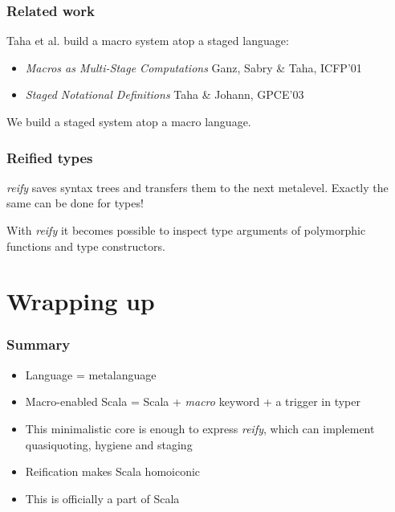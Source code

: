 \documentclass[hyperref={bookmarks=false}]{beamer}
\begin{document}
\begin{frame}[fragile]
\frametitle{Related work}

Taha et al. build a macro system atop a staged language:
\begin{itemize}
\item \emph{Macros as Multi-Stage Computations} Ganz, Sabry \& Taha, ICFP'01
\item \emph{Staged Notational Definitions} Taha \& Johann, GPCE'03
\end{itemize}

We build a staged system atop a macro language.

\end{frame}

\begin{frame}[fragile]
\frametitle{Reified types}

\emph{reify} saves syntax trees and transfers them to the next metalevel. Exactly the same can be done for types!

With \emph{reify} it becomes possible to inspect type arguments of polymorphic functions and type constructors.
\end{frame}

\section{Wrapping up}

\begin{frame}[fragile]
\frametitle{Summary}

\begin{itemize}
\item Language = metalanguage
\item Macro-enabled Scala = Scala + \emph{macro} keyword + a trigger in typer
\item This minimalistic core is enough to express \emph{reify}, which can implement quasiquoting, hygiene and staging
\item Reification makes Scala homoiconic
\item This is officially a part of Scala
\end{itemize}
\end{frame}
\end{document}
